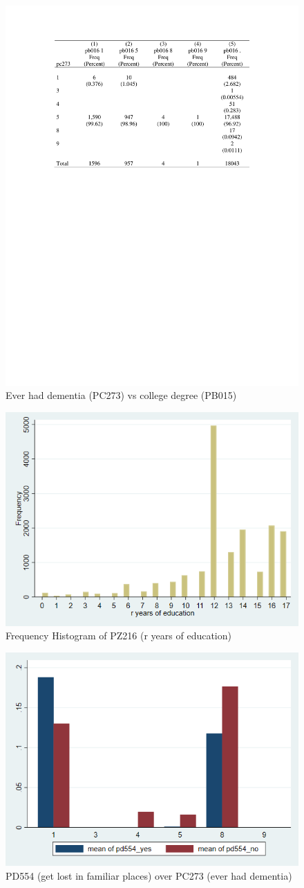 \documentclass{article}
\begin{document}
\begin{figure}
    \centering
    \includegraphics[width=0.5\linewidth]{ever had dementia vs r high school diploma or ged ctab.doc.pdf}
    \caption{Ever had dementia (PC273) vs college degree (PB015)}
    \label{fig:enter-label}
\end{figure}

\begin{figure}
    \centering
    \includegraphics[width=0.5\linewidth]{frequency_histogram_pz216.png}
    \caption{Frequency Histogram of PZ216 (r years of education)}
    \label{fig:enter-label}
\end{figure}

\begin{figure}
    \centering
    \includegraphics[width=0.5\linewidth]{pd554_over_pc273.png}
    \caption{PD554 (get lost in familiar places) over PC273 (ever had dementia)}
    \label{fig:enter-label}
\end{figure}
\end{document}
